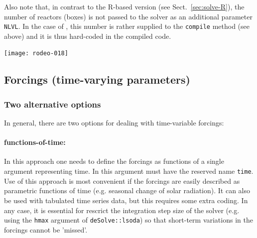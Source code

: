 \documentclass[times,onecolumn]{article}
\begin{document}
Also note that, in contrast to the R-based version (see Sect.~\ref{sec:solve-R}), the number of reactors (boxes) is not passed to the solver as an additional parameter \verb|NLVL|. In the case of , this number is rather supplied to the \verb|compile| method (see above) and it is thus hard-coded in the compiled code.

\begin{Schunk}
\end{Schunk}
\texttt{[image: rodeo-018]}



\subsection{Forcings (time-varying parameters)} \label{sec:advanced:forcings}

\subsubsection{Two alternative options}
In general, there are two options for dealing with time-variable forcings:

\paragraph{functions-of-time:} In this approach one needs to define the forcings as functions of a single argument representing time. In  this argument must have the reserved name \verb|time|. Use of this approach is most convenient if the forcings are easily described as parametric functions of time (e.g. seasonal change of solar radiation). It can also be used with tabulated time series data, but this requires some extra coding. In any case, it is essential for rescrict the integration step size of the solver (e.g. using the \verb|hmax| argument of \verb|deSolve::lsoda|) so that short-term variations in the forcings cannot be 'missed'.
 
\end{document}
